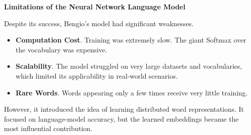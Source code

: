 \highspace
\begin{flushleft}
    \textcolor{Red2}{ \textbf{Limitations of the Neural Network Language Model}}
\end{flushleft}
Despite its success, Bengio's model had significant weaknesses.
\begin{itemize}
    \item \textbf{Computation Cost}. Training was extremely slow. The giant Softmax over the vocabulary was expensive.
    \item \textbf{Scalability}. The model struggled on very large datasets and vocabularies, which limited its applicability in real-world scenarios.
    \item \textbf{Rare Words}. Words appearing only a few times receive very little training.
\end{itemize}
However, it introduced the idea of learning distributed word representations. It focused on language-model accuracy, but the learned embeddings became the most influential contribution. 